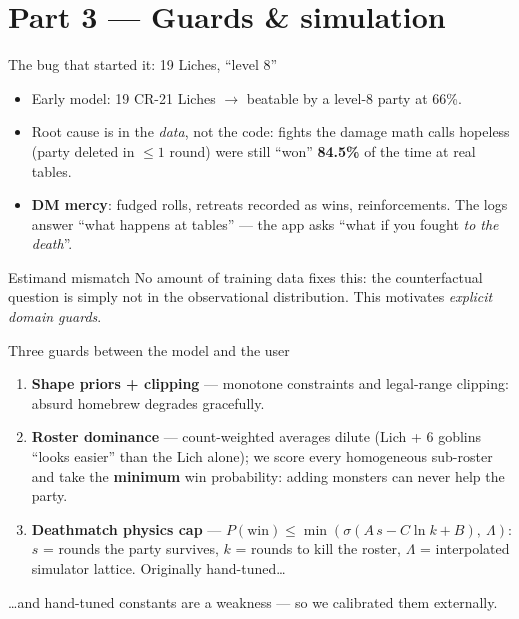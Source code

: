 \documentclass[aspectratio=169,11pt]{beamer}
\begin{document}
\section{Part 3 — Guards \& simulation}

\begin{frame}{The bug that started it: 19 Liches, ``level 8''}
  \begin{itemize}
    \item Early model: 19 CR-21 Liches $\to$ beatable by a level-8 party at 66\%.
    \item Root cause is in the \emph{data}, not the code: fights the damage math calls hopeless (party deleted in $\leq 1$ round) were still ``won'' \textbf{84.5\%} of the time at real tables.
    \item \textbf{DM mercy}: fudged rolls, retreats recorded as wins, reinforcements. The logs answer ``what happens at tables'' — the app asks ``what if you fought \emph{to the death}''.
  \end{itemize}
  \begin{block}{Estimand mismatch}
    No amount of training data fixes this: the counterfactual question is simply not in the observational distribution. This motivates \emph{explicit domain guards}.
  \end{block}
\end{frame}

\begin{frame}{Three guards between the model and the user}
  \begin{enumerate}
    \item \textbf{Shape priors + clipping} — monotone constraints and legal-range clipping: absurd homebrew degrades gracefully.
    \item \textbf{Roster dominance} — count-weighted averages dilute (Lich + 6 goblins ``looks easier'' than the Lich alone); we score every homogeneous sub-roster and take the \textbf{minimum} win probability: adding monsters can never help the party.
    \item \textbf{Deathmatch physics cap} — $P(\text{win}) \leq \min(\sigma(A\,s - C\ln k + B),\ \Lambda)$: $s$ = rounds the party survives, $k$ = rounds to kill the roster, $\Lambda$ = interpolated simulator lattice. Originally hand-tuned\ldots
  \end{enumerate}
  \begin{exampleblock}{}
    \centering \ldots and hand-tuned constants are a weakness — so we calibrated them externally.
  \end{exampleblock}
\end{frame}
\end{document}
